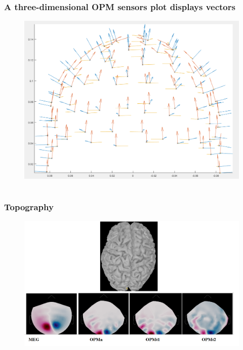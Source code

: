 \documentclass{beamer}
\numberwithin{figure}{section}
\numberwithin{equation}{section}
\begin{document}
\section{}
\begin{frame}
 \frametitle{A three-dimensional OPM sensors plot displays vectors}
	\begin{figure}[p]
  		\centering
  		\includegraphics[width=0.6\linewidth]{pictures/opmvect}
  		\label{fig:approaches_RDF}
 	\end{figure}

  
\end{frame}



\section{}
\begin{frame}
 \frametitle{Topography}
	\begin{figure}[p]
  		\centering
  		\includegraphics[width=1.12\linewidth]{pictures/topl}
  		\label{fig:approaches_RDF}
 	\end{figure}

  
\end{frame}
\end{document}
